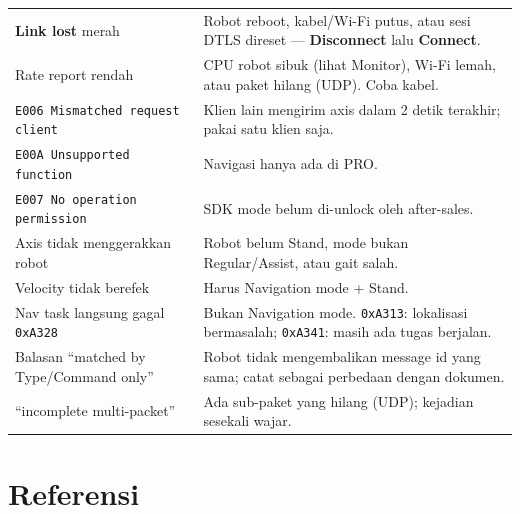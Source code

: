 \documentclass[11pt,a4paper]{article}
\newcommand{\code}[1]{\texttt{#1}}
\newcommand{\ui}[1]{\textbf{#1}}
\begin{document}
\begin{xltabular}{\linewidth}{@{}L{54mm}Y@{}}
\ui{Link lost} merah & Robot reboot, kabel/Wi-Fi putus, atau sesi DTLS direset --- \ui{Disconnect} lalu \ui{Connect}.\\
Rate report rendah & CPU robot sibuk (lihat Monitor), Wi-Fi lemah, atau paket hilang (UDP). Coba kabel.\\
\code{E006 Mismatched request client} & Klien lain mengirim axis dalam 2 detik terakhir; pakai satu klien saja.\\
\code{E00A Unsupported function} & Navigasi hanya ada di PRO.\\
\code{E007 No operation permission} & SDK mode belum di-unlock oleh after-sales.\\
Axis tidak menggerakkan robot & Robot belum Stand, mode bukan Regular/Assist, atau gait salah.\\
Velocity tidak berefek & Harus Navigation mode + Stand.\\
Nav task langsung gagal \code{0xA328} & Bukan Navigation mode. \code{0xA313}: lokalisasi bermasalah; \code{0xA341}: masih ada tugas berjalan.\\
Balasan ``matched by Type/Command only'' & Robot tidak mengembalikan message id yang sama; catat sebagai perbedaan dengan dokumen.\\
``incomplete multi-packet'' & Ada sub-paket yang hilang (UDP); kejadian sesekali wajar.\\
\bottomrule
\end{xltabular}

\section{Referensi}\label{sec:ref}
\end{document}
